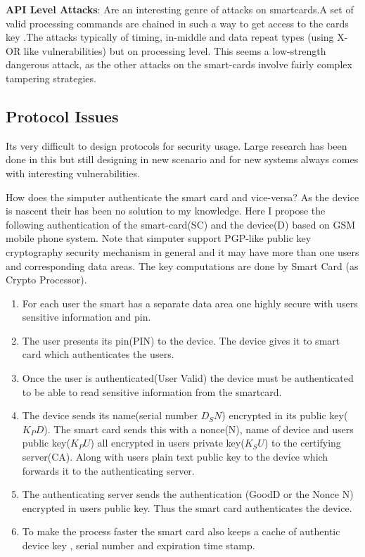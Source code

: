 \documentclass[11pt]{article}
\begin{document}
{\bf API Level Attacks}: Are an interesting genre of attacks on smartcards.A set of valid processing commands are chained in such a way to get access to the cards key \cite{bond01}.The attacks typically of timing, in-middle and data repeat types (using X-OR like vulnerabilities) but on processing level. This seems a low-strength dangerous attack, as the other attacks on the smart-cards involve fairly complex tampering strategies.

\subsection{Protocol Issues}
Its very difficult to design protocols for security usage. Large research has been done in this but still designing in new scenario and for new systems  always comes with interesting vulnerabilities.

How does the simputer authenticate the smart card and vice-versa? As the device is nascent their has been no solution to my knowledge. Here I propose the following authentication of the smart-card(SC) and the device(D) based on GSM mobile phone system\cite{ross01}. Note that simputer support PGP-like public key cryptography security mechanism in general and it may have more than one users and corresponding data areas. The key computations are done by Smart Card (as Crypto Processor).

\begin{enumerate}\addtolength{\itemsep}{-0.5\baselineskip}
\item For each user the smart has a separate data area one highly secure with users sensitive information and pin.
\item The user presents its pin(PIN) to the device. The device gives it to smart card which authenticates the users.
\item Once the user is authenticated(User Valid) the device must be authenticated to be able to read sensitive information from the smartcard.
\item The device sends its name(serial number $D_SN$) encrypted in its public key($K_PD$). The smart card sends this with a nonce(N), name of device and  users public key($K_PU$) all encrypted in users private key($K_SU$) to the certifying server(CA). Along with users plain text public key to the device which forwards it to the authenticating server. 
\item The authenticating server sends the authentication (GoodD or the Nonce N) encrypted in users public key. Thus the smart card authenticates the device.
\item To make the process faster the smart card also keeps a cache of authentic device key , serial number and expiration time stamp.
\end{enumerate}
\end{document}
